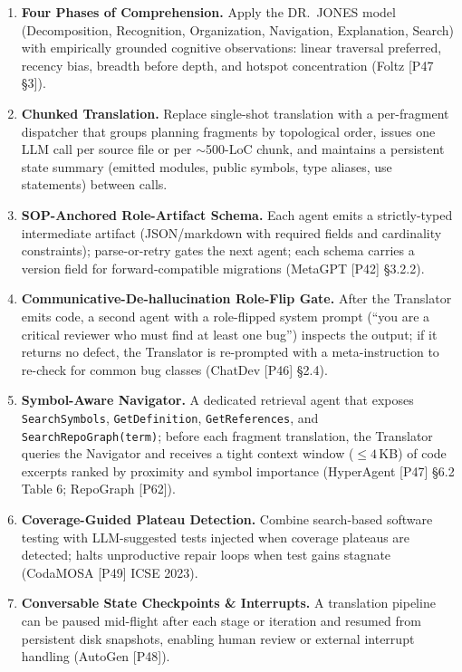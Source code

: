 \begin{enumerate}
\item \textbf{Four Phases of Comprehension.}
Apply the DR.\ JONES model (Decomposition, Recognition, Organization, Navigation, Explanation, Search) with empirically grounded cognitive observations: linear traversal preferred, recency bias, breadth before depth, and hotspot concentration (Foltz [P47 \S3]).

\item \textbf{Chunked Translation.}
Replace single-shot translation with a per-fragment dispatcher that groups planning fragments by topological order, issues one LLM call per source file or per $\sim$500-LoC chunk, and maintains a persistent state summary (emitted modules, public symbols, type aliases, use statements) between calls.

\item \textbf{SOP-Anchored Role-Artifact Schema.}
Each agent emits a strictly-typed intermediate artifact (JSON/markdown with required fields and cardinality constraints); parse-or-retry gates the next agent; each schema carries a version field for forward-compatible migrations (MetaGPT [P42] \S3.2.2).

\item \textbf{Communicative-De-hallucination Role-Flip Gate.}
After the Translator emits code, a second agent with a role-flipped system prompt (``you are a critical reviewer who must find at least one bug'') inspects the output; if it returns no defect, the Translator is re-prompted with a meta-instruction to re-check for common bug classes (ChatDev [P46] \S2.4).

\item \textbf{Symbol-Aware Navigator.}
A dedicated retrieval agent that exposes \texttt{SearchSymbols}, \texttt{GetDefinition}, \texttt{GetReferences}, and \texttt{SearchRepoGraph(term)}; before each fragment translation, the Translator queries the Navigator and receives a tight context window ($\le 4$\,KB) of code excerpts ranked by proximity and symbol importance (HyperAgent [P47] \S6.2 Table 6; RepoGraph [P62]).

\item \textbf{Coverage-Guided Plateau Detection.}
Combine search-based software testing with LLM-suggested tests injected when coverage plateaus are detected; halts unproductive repair loops when test gains stagnate (CodaMOSA [P49] ICSE 2023).

\item \textbf{Conversable State Checkpoints \& Interrupts.}
A translation pipeline can be paused mid-flight after each stage or iteration and resumed from persistent disk snapshots, enabling human review or external interrupt handling (AutoGen [P48]).


\end{enumerate}
